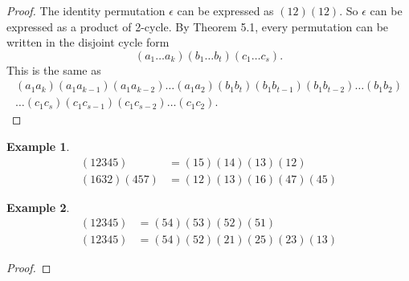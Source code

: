 \documentclass{article}
\newtheorem{theorem}{Theorem}[section]
\newtheorem{lemma}{Lemma}[section]
\theoremstyle{definition}
\newtheorem{example}{Example}[section]
\begin{document}
 \noindent{}
 
 \begin{proof}
     The identity permutation $\epsilon$ can be expressed as $(12)(12)$. So $\epsilon$ can be expressed as a product of 2-cycle. By Theorem 5.1, every permutation can be written in the disjoint cycle form
     \begin{equation*}
         (a_1 \dots a_k)(b_1 \dots b_t)(c_1 \dots c_s).
     \end{equation*}
     This is the same as
     \begin{align*}
         (a_1a_k)(a_1a_{k-1})(a_1a_{k-2}) \dots (a_1a_2)(b_1b_t)(b_1b_{t-1})(b_1b_{t-2}) \dots (b_1b_2) \\
         \dots (c_1c_s)(c_1c_{s-1})(c_1c_{s-2}) \dots (c_1c_2).
     \end{align*}
 \end{proof}
 
 \begin{example}
 \begin{align*}
     (12345) &= (15)(14)(13)(12) \\
    (1632)(457) &= (12)(13)(16)(47)(45)
 \end{align*}
 \end{example}
 
 \begin{example}
 \begin{align*}
     (12345) &= (54)(53)(52)(51) \\
     (12345) &= (54)(52)(21)(25)(23)(13)
 \end{align*}
 \end{example}
 
 \noindent{}
 
 \begin{proof}
     
 \end{proof}
 
 \noindent{}
 
\end{document}
